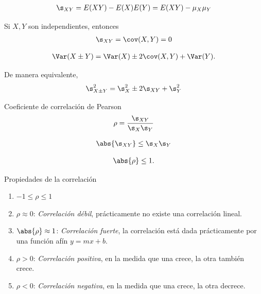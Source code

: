  \begin{align}
  \label{eq:3.50}
  \s_{XY}=E(XY)-E(X)E(Y)=E(XY)-\mu_{X}\mu_{Y}
 \end{align}


 Si $X,Y$ son independientes, entonces
 \begin{align}
  \label{eq:3.50}
  \s_{XY}=\cov(X,Y)=0
 \end{align}



 \begin{align}
  \label{eq:3.51}
  \Var(X\pm Y)=\Var(X)\pm2\cov(X,Y)+\Var(Y).
 \end{align}




 De manera equivalente,
 \begin{align}
  \label{eq:3.52}
  \s_{X\pm Y}^{2}=\s_{X}^{2} \pm 2\s_{XY} +\s_{Y}^{2}
 \end{align}


{Coeficiente de correlación de Pearson}
 \begin{align}
  \label{eq:3.54}
  \rho = \dfrac{\s_{XY}}{\s_{X}\s_{Y}}
 \end{align}



 \begin{thm}
  \begin{align}
   \label{eq:3.53}
   \abs{\s_{XY}}\leq \s_{X}\s_{Y}
  \end{align}


 \begin{align}
  \abs{\rho}\leq 1.
 \end{align}
 \end{thm}


{Propiedades de la correlación}

\begin{enumerate}
\item $-1 \leq \rho \leq 1$ 
 \item $\rho \approx 0$: \emph{Correlación débil}, prácticamente no existe una correlación lineal. 
 \item $\abs{\rho} \approx 1$:\emph{ Correlación fuerte}, la correlación está dada prácticamente por una función afín $y=mx+b$. 
 \item $\rho > 0$: \emph{Correlación positiva}, en la medida que una crece, la otra también crece. 
 \item $\rho < 0$: \emph{Correlación negativa}, en la medida que una crece, la otra decrece.
\end{enumerate}



